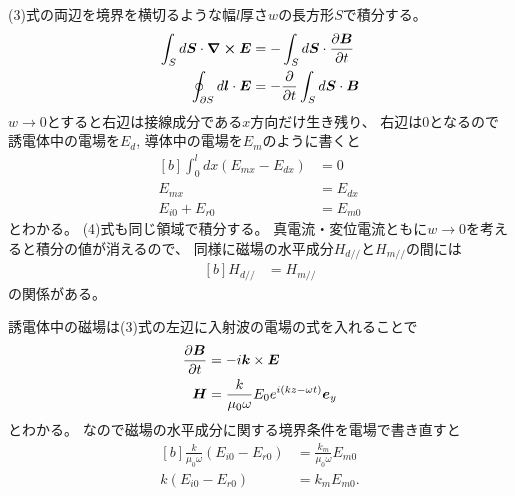 \documentclass[../../sp_2013.tex]{subfiles}
\begin{document}
\subsection{}
(3)式の両辺を境界を横切るような幅\(l\)厚さ\(w\)の長方形\(S\)で積分する。
\begin{equation}\begin{aligned}[b]
    \int_{S}d \vb*{S}\cdot \curl{\vb*{E}} &= -\int_{S}d \vb*{S}\cdot \pdv{\vb*{B}}{t}\\
    \oint_{\partial S}d \vb*{l}\cdot \vb*{E} &= -\pdv{t} \int_{S}d \vb*{S}\cdot \vb*{B}
\end{aligned}\end{equation}
\(w\to0\)とすると右辺は接線成分である\(x\)方向だけ生き残り、
右辺は0となるので誘電体中の電場を\(E_d\), 導体中の電場を\(E_m\)のように書くと
\begin{equation}\begin{aligned}[b]
    \int_{0}^{l}dx (E_{mx}-E_{dx})&=0\\
    E_{mx} &= E_{dx}\\
    E_{i0}+E_{r0} &= E_{m0}
\end{aligned}\end{equation}
とわかる。
(4)式も同じ領域で積分する。
真電流・変位電流ともに\(w\to0\)を考えると積分の値が消えるので、
同様に磁場の水平成分\(H_{d//}\)と\(H_{m//}\)の間には
\begin{equation}\begin{aligned}[b]
    H_{d//} &= H_{m//}
\end{aligned}\end{equation}
の関係がある。

誘電体中の磁場は(3)式の左辺に入射波の電場の式を入れることで
\begin{equation}\begin{aligned}[b]
    \pdv{\vb*{B}}{t} &= - i \vb*{k}\times \vb*{E}\\
    \vb*{H} &= \frac{k}{\mu_0 \omega} E_{0}e^{i(kz-\omega t)} \vb*{e}_y
\end{aligned}\end{equation}
とわかる。
なので磁場の水平成分に関する境界条件を電場で書き直すと
\begin{equation}\begin{aligned}[b]
    \frac{k}{\mu_0 \omega}(E_{i0}-E_{r0}) &= \frac{k_m}{\mu_0 \omega}E_{m0}\\
    k(E_{i0}-E_{r0}) &= k_m E_{m0}.
\end{aligned}\end{equation}
\end{document}
